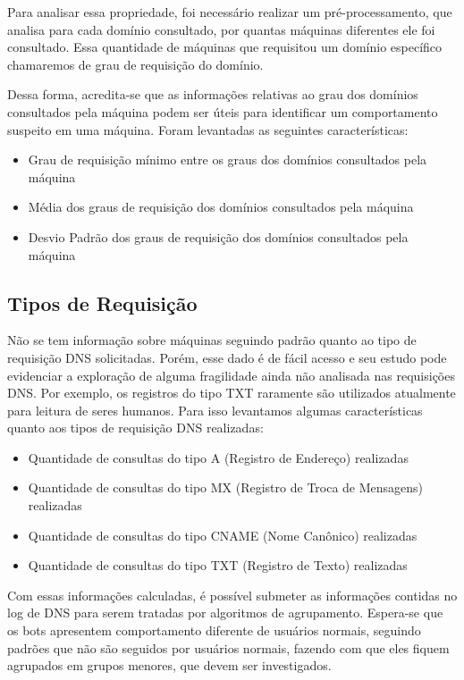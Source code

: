 Para analisar essa propriedade, foi necessário realizar um pré-processamento, que analisa para cada domínio consultado, por quantas máquinas diferentes ele foi consultado. Essa quantidade de máquinas que requisitou um domínio específico chamaremos de grau de requisição do domínio.

Dessa forma, acredita-se que as informações relativas ao grau dos domínios consultados pela máquina podem ser úteis para identificar um comportamento suspeito em uma máquina. Foram levantadas as seguintes características:

\begin{itemize}
\item Grau de requisição mínimo entre os graus dos domínios consultados pela máquina
\item Média dos graus de requisição dos domínios consultados pela máquina
\item Desvio Padrão dos graus de requisição dos domínios consultados pela máquina

\end{itemize}

\subsection{Tipos de Requisição}

Não se tem informação sobre máquinas seguindo padrão quanto ao tipo de requisição DNS solicitadas. Porém, esse dado é de fácil acesso e seu estudo pode evidenciar a exploração de alguma fragilidade ainda não analisada nas requisições DNS. Por exemplo, os registros do tipo TXT raramente são utilizados atualmente para leitura de seres humanos. Para isso levantamos algumas características quanto aos tipos de requisição DNS realizadas:

\begin{itemize}
\item Quantidade de consultas do tipo A (Registro de Endereço) realizadas
\item Quantidade de consultas do tipo MX (Registro de Troca de Mensagens) realizadas
\item Quantidade de consultas do tipo CNAME (Nome Canônico) realizadas
\item Quantidade de consultas do tipo TXT (Registro de Texto) realizadas
\end{itemize}

Com essas informações calculadas, é possível submeter as informações contidas no log de DNS para serem tratadas por algoritmos de agrupamento. Espera-se que os bots apresentem comportamento diferente de usuários normais, seguindo padrões que não são seguidos por usuários normais, fazendo com que eles fiquem agrupados em grupos menores, que devem ser investigados.
